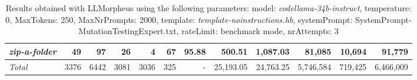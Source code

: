 \begin{table*}
{\begin{tabular}{l||r|r|r|r|r|r||r|r||r|r|r}
   \hline
   \textit{zip-a-folder} & 49 & 97 & 26 & 4 & 67 & 95.88 & 500.51 & 1,087.03 & 81,085 & 10,694 & 91,779 \\ 
   \hline
   \textit{Total} & 3376 & 6442 & 3081 & 3036 & 325 & - & 25,193.05  & 24,763.25 & 5,746,584 & 719,425 & 6,466,009 \\ 
 \end{tabular}
 }
 \caption{Results obtained with LLMorpheus using the following parameters: 
   model: \textit{codellama-34b-instruct}, 
   temperature: 0, 
   MaxTokens: 250, 
   MaxNrPrompts: 2000, 
   template: \textit{template-noinstructions.hb}, 
   systemPrompt: SystemPrompt-MutationTestingExpert.txt, 
   rateLimit: benchmark mode, 
   nrAttempts: 3  
 }
\end{table*}

